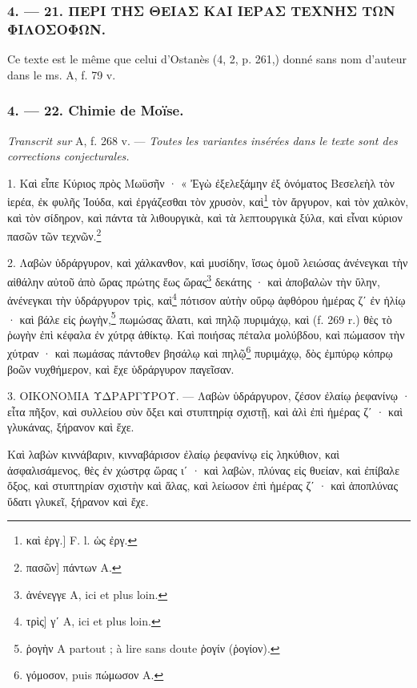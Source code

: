 \documentclass[a4paper, 11pt, oneside, polutonikogreek, french]{article}
\begin{document}
\bigskip
\centerline{\EightStarTaper}
\centerline{\EightStarTaper\EightStarTaper}
\bigskip

\subsubsection{4. --- 21. ΠΕΡΙ ΤΗΣ ΘΕΙΑΣ ΚΑΙ ΙΕΡΑΣ ΤΕΧΝΗΣ ΤΩΝ ΦΙΛΟΣΟΦΩΝ.}

Ce texte est le même que celui d'Ostanès (4, 2, p. 261,) donné sans nom d'auteur dans le ms. A, f. 79 v.

\bigskip
\centerline{\EightStarTaper}
\centerline{\EightStarTaper\EightStarTaper}
\bigskip

\subsubsection{4. --- 22. Chimie de Moïse.}

\emph{Transcrit sur} A, f. 268 v. --- \emph{Toutes les variantes insérées dans le texte sont des corrections conjecturales.}

1. Καὶ εἶπε Κύριος πρὸς Μωϋσῆν · « Ἐγὼ ἐξελεξάμην ἐξ ὀνόματος Βεσελεὴλ τὸν ἱερέα, ἐκ φυλῆς Ἰούδα, καὶ ἐργάζεσθαι τὸν χρυσὸν, καὶ\footnote{καὶ ἐργ.] F. l. ὡς ἐργ.} τὸν ἄργυρον, καὶ τὸν χαλκὸν, καὶ τὸν σίδηρον, καὶ πάντα τὰ λιθουργικὰ, καὶ τὰ λεπτουργικὰ ξύλα, καὶ εἶναι κύριον πασῶν τῶν τεχνῶν.\footnote{πασῶν] πάντων A.}

2. Λαβὼν ὑδράργυρον, καὶ χάλκανθον, καὶ μυσίδην, ἴσως ὁμοῦ λειώσας ἀνένεγκαι τὴν αἰθάλην αὐτοῦ ἀπὸ ὤρας πρώτης ἕως ὥρας\footnote{ἀνένεγγε A, ici et plus loin.} δεκάτης · καὶ ἀποβαλὼν τὴν ὕλην, ἀνένεγκαι τὴν ὑδράργυρον τρὶς, καὶ\footnote{τρὶς] γʹ A, ici et plus loin.} πότισον αὐτὴν οὔρῳ ἀφθόρου ἡμέρας ζʹ ἐν ἡλίῳ · καὶ βάλε εἰς ῥωγὴν,\footnote{ῥογὴν A partout ; à lire sans doute ῥογίν (ῥογίον).} πωμώσας ἅλατι, καὶ πηλῷ πυριμάχῳ, καὶ (f. 269 r.) θὲς τὸ ῥωγὴν ἐπὶ κέφαλα ἐν χύτρᾳ ἀθίκτῳ. Καὶ ποιήσας πέταλα μολύβδου, καὶ πώμασον τὴν χύτραν · καὶ πωμάσας πάντοθεν βησάλῳ καὶ πηλῷ\footnote{γόμοσον, puis πώμωσον A.} πυριμάχῳ, δὸς ἐμπύρῳ κόπρῳ βοῶν νυχθήμερον, καὶ ἔχε ὑδράργυρον παγεῖσαν.

3. ΟΙΚΟΝΟΜΙΑ ΥΔΡΑΡΓΥΡΟΥ. --- Λαβὼν ὑδράργυρον, ζέσον ἐλαίῳ ῥεφανίνῳ · εἶτα πῆξον, καὶ συλλείου σὺν ὄξει καὶ στυπτηρίᾳ σχιστῇ, καὶ ἀλὶ ἐπὶ ἡμέρας ζʹ · καὶ γλυκάνας, ξήρανον καὶ ἔχε.

Καὶ λαβὼν κιννάβαριν, κινναβάρισον ἐλαίῳ ῥεφανίνῳ εἰς ληκύθιον, καὶ ἀσφαλισάμενος, θὲς ἐν χώστρᾳ ὥρας ιʹ · καὶ λαβὼν, πλύνας εἰς θυείαν, καὶ ἐπίβαλε ὄξος, καὶ στυπτηρίαν σχιστὴν καὶ ἅλας, καὶ λείωσον ἐπὶ ἡμέρας ζʹ · καὶ ἀποπλύνας ὕδατι γλυκεῖ, ξήρανον καὶ ἔχε.
\end{document}
